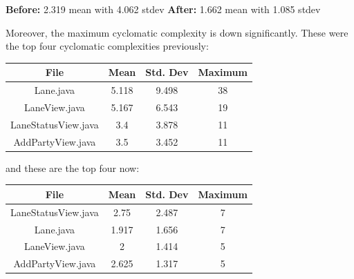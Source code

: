 \textbf{Before:} 2.319 mean with 4.062 stdev
\textbf{After:} 1.662 mean with 1.085 stdev

Moreover, the maximum cyclomatic complexity is down significantly. These were the top four cyclomatic complexities previously:

\begin{tabular}{ |c|c|c|c| }
    \hline
    \textbf{File}       & \textbf{Mean} & \textbf{Std. Dev} & \textbf{Maximum} \\
    \hline
    Lane.java           & 5.118         & 9.498             & 38               \\
    LaneView.java       & 5.167         & 6.543             & 19               \\
    LaneStatusView.java & 3.4           & 3.878             & 11               \\
    AddPartyView.java   & 3.5           & 3.452             & 11               \\
    \hline
\end{tabular}

and these are the top four now:

\begin{tabular}{ |c|c|c|c| }
    \hline
    \textbf{File}       & \textbf{Mean} & \textbf{Std. Dev} & \textbf{Maximum} \\
    \hline
    LaneStatusView.java & 2.75          & 2.487             & 7                \\
    Lane.java           & 1.917         & 1.656             & 7                \\
    LaneView.java       & 2             & 1.414             & 5                \\
    AddPartyView.java   & 2.625         & 1.317             & 5                \\
    \hline
\end{tabular}